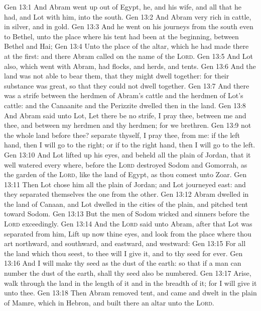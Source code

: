 \vs Gen 13:1 And Abram went up out of Egypt, he, and his wife, and all that he had, and Lot with him, into the south.
\vs Gen 13:2 And Abram  very rich in cattle, in silver, and in gold.
\vs Gen 13:3 And he went on his journeys from the south even to Bethel, unto the place where his tent had been at the beginning, between Bethel and Hai;
\vs Gen 13:4 Unto the place of the altar, which he had made there at the first: and there Abram called on the name of the \textsc{Lord}.
\vs Gen 13:5 And Lot also, which went with Abram, had flocks, and herds, and tents.
\vs Gen 13:6 And the land was not able to bear them, that they might dwell together: for their substance was great, so that they could not dwell together.
\vs Gen 13:7 And there was a strife between the herdmen of Abram's cattle and the herdmen of Lot's cattle: and the Canaanite and the Perizzite dwelled then in the land.
\vs Gen 13:8 And Abram said unto Lot, Let there be no strife, I pray thee, between me and thee, and between my herdmen and thy herdmen; for we  brethren.
\vs Gen 13:9  not the whole land before thee? separate thyself, I pray thee, from me: if  the left hand, then I will go to the right; or if  to the right hand, then I will go to the left.
\vs Gen 13:10 And Lot lifted up his eyes, and beheld all the plain of Jordan, that it  well watered every where, before the \textsc{Lord} destroyed Sodom and Gomorrah,  as the garden of the \textsc{Lord}, like the land of Egypt, as thou comest unto Zoar.
\vs Gen 13:11 Then Lot chose him all the plain of Jordan; and Lot journeyed east: and they separated themselves the one from the other.
\vs Gen 13:12 Abram dwelled in the land of Canaan, and Lot dwelled in the cities of the plain, and pitched  tent toward Sodom.
\vs Gen 13:13 But the men of Sodom  wicked and sinners before the \textsc{Lord} exceedingly.
\vs Gen 13:14 And the \textsc{Lord} said unto Abram, after that Lot was separated from him, Lift up now thine eyes, and look from the place where thou art northward, and southward, and eastward, and westward:
\vs Gen 13:15 For all the land which thou seest, to thee will I give it, and to thy seed for ever.
\vs Gen 13:16 And I will make thy seed as the dust of the earth: so that if a man can number the dust of the earth,  shall thy seed also be numbered.
\vs Gen 13:17 Arise, walk through the land in the length of it and in the breadth of it; for I will give it unto thee.
\vs Gen 13:18 Then Abram removed  tent, and came and dwelt in the plain of Mamre, which  in Hebron, and built there an altar unto the \textsc{Lord}.
